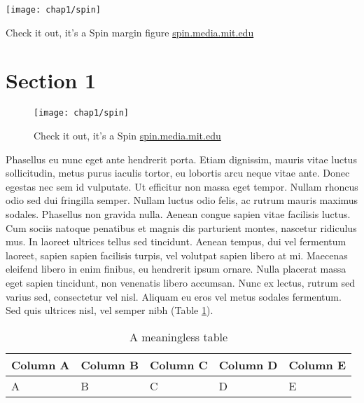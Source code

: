 \begin{marginfigure}[{-10cm}]
 	\texttt{[image: chap1/spin]}               
 	 \caption{Check it out, it's a Spin margin figure \url{spin.media.mit.edu}}
  	\label{fig:spin_margin}
\end{marginfigure}

\section{Section 1}

\begin{figure}[htb]
 	\texttt{[image: chap1/spin]}               
 	 \caption{Check it out, it's a Spin \url{spin.media.mit.edu}}
  	\label{fig:spin}
\end{figure}

Phasellus eu nunc eget ante hendrerit porta. Etiam dignissim, mauris vitae luctus sollicitudin, metus purus iaculis tortor, eu lobortis arcu neque vitae ante. Donec egestas nec sem id vulputate. Ut efficitur non massa eget tempor. Nullam rhoncus odio sed dui fringilla semper. Nullam luctus odio felis, ac rutrum mauris maximus sodales. Phasellus non gravida nulla. Aenean congue sapien vitae facilisis luctus. Cum sociis natoque penatibus et magnis dis parturient montes, nascetur ridiculus mus. In laoreet ultrices tellus sed tincidunt. Aenean tempus, dui vel fermentum laoreet, sapien sapien facilisis turpis, vel volutpat sapien libero at mi. Maecenas eleifend libero in enim finibus, eu hendrerit ipsum ornare. Nulla placerat massa eget sapien tincidunt, non venenatis libero accumsan. Nunc ex lectus, rutrum sed varius sed, consectetur vel nisl. Aliquam eu eros vel metus sodales fermentum. Sed quis ultrices nisl, vel semper nibh (Table \ref{tab:sample_table}).

\begin{table}
  \centering
  \begin{tabular}{l l l l l}
    Column A & Column B & Column C & Column D & Column E \\
    \toprule
    A & B & C & D & E
  \end{tabular}
  \caption{A meaningless table}
  \label{tab:sample_table}
\end{table}
